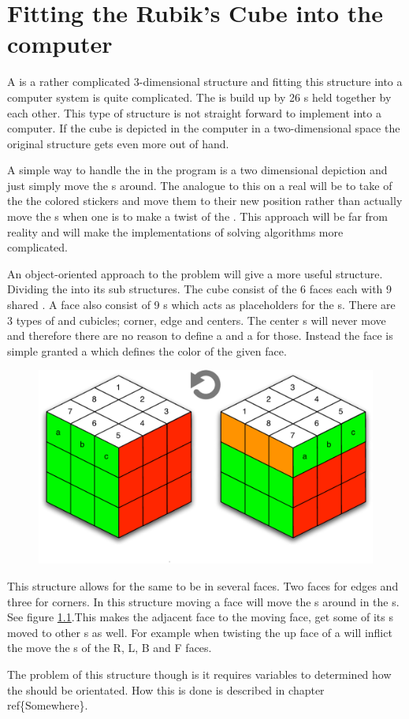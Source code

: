 \chapter{Fitting the Rubik's Cube into the computer}
A \rubik{} is a rather complicated 3-dimensional structure and fitting this structure into a computer system is quite complicated. 
The \rubik{} is build up by 26 \cpiece{}s held together by each other. 
This type of structure is not straight forward to implement into a computer. If the cube is depicted in the computer in a two-dimensional space the original \rubik{} structure gets even more out of hand.%

A simple way to handle the \rubik{} in the program is a two dimensional depiction and  just simply move the \facelet{}s around.
The analogue to this on a real \rubik{} will be to take of the the colored stickers and move them to their new position rather than actually move the \cubie{}s when one is to make a twist of the \rubik{}.
This approach will be far from reality and will make the implementations of solving algorithms more complicated.

An object-oriented approach to the problem will give a more useful structure. 
Dividing the \rubik{} into its sub structures. 
The cube consist of the 6 faces each with 9 shared \cpiece{}. 
A face also consist of 9 \cubicle{}s which acts as placeholders for the \cpiece{}s. 
There are 3 types of \cpiece{} and cubicles; corner, edge and centers. 
The center \cpiece{}s will never move and therefore there are no reason to define a \cubicle{} and a \cpiece{} for those. Instead the face is simple granted a \facelet{} which defines the color of the given face.
\begin{figure}[h]
	\centering
		\includegraphics[scale=0.7]{input/pics/twistOfUpFace.pdf}
	\caption{}
	\label{fig:twistOfUpFace}
\end{figure}
This structure allows for the same \cubicle{} to be in several faces. 
Two faces for edges and three for corners. 
In this structure moving a face will move the \cpiece{}s around in the \cubicle{}s. See figure \ref{fig:twistOfUpFace}.This makes the adjacent face to the moving face, get some of its \cpiece{}s moved to other \cubicle{}s as well. 
For example when twisting the up face of a \rubik{} will inflict the move the \cpiece{}s of the R, L, B and F faces. 

The problem of this structure though is it requires variables to determined how the \facelet{} should be orientated. 
How this is done is described in chapter ref\{Somewhere\}.
